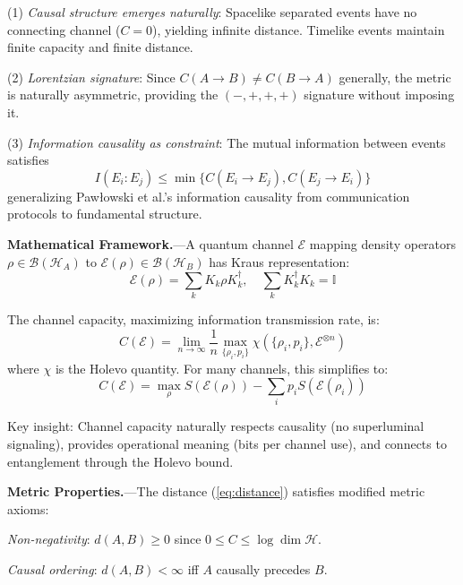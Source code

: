 \documentclass[aps,prl,twocolumn,showpacs,superscriptaddress,groupedaddress]{revtex4-2}
\begin{document}
(1) \textit{Causal structure emerges naturally}: Spacelike separated events have no connecting channel ($C = 0$), yielding infinite distance. Timelike events maintain finite capacity and finite distance.

(2) \textit{Lorentzian signature}: Since $C(A \to B) \neq C(B \to A)$ generally, the metric is naturally asymmetric, providing the $(-,+,+,+)$ signature without imposing it.

(3) \textit{Information causality as constraint}: The mutual information between events satisfies
\begin{equation}
I(E_i : E_j) \leq \min\{C(E_i \to E_j), C(E_j \to E_i)\}
\label{eq:IC_bound}
\end{equation}
generalizing Pawłowski et al.'s information causality \cite{Pawlowski2009} from communication protocols to fundamental structure.

\textbf{Mathematical Framework.}---A quantum channel $\mathcal{E}$ mapping density operators $\rho \in \mathcal{B}(\mathcal{H}_A)$ to $\mathcal{E}(\rho) \in \mathcal{B}(\mathcal{H}_B)$ has Kraus representation:
\begin{equation}
\mathcal{E}(\rho) = \sum_k K_k \rho K_k^\dagger, \quad \sum_k K_k^\dagger K_k = \mathbb{I}
\end{equation}

The channel capacity, maximizing information transmission rate, is:
\begin{equation}
C(\mathcal{E}) = \lim_{n \to \infty} \frac{1}{n} \max_{\{\rho_i, p_i\}} \chi(\{\rho_i, p_i\}, \mathcal{E}^{\otimes n})
\end{equation}
where $\chi$ is the Holevo quantity. For many channels, this simplifies to:
\begin{equation}
C(\mathcal{E}) = \max_{\rho} S(\mathcal{E}(\rho)) - \sum_i p_i S(\mathcal{E}(\rho_i))
\end{equation}

Key insight: Channel capacity naturally respects causality (no superluminal signaling), provides operational meaning (bits per channel use), and connects to entanglement through the Holevo bound.

\textbf{Metric Properties.}---The distance (\ref{eq:distance}) satisfies modified metric axioms:

\textit{Non-negativity}: $d(A,B) \geq 0$ since $0 \leq C \leq \log \dim \mathcal{H}$.

\textit{Causal ordering}: $d(A,B) < \infty$ iff $A$ causally precedes $B$.
\end{document}
